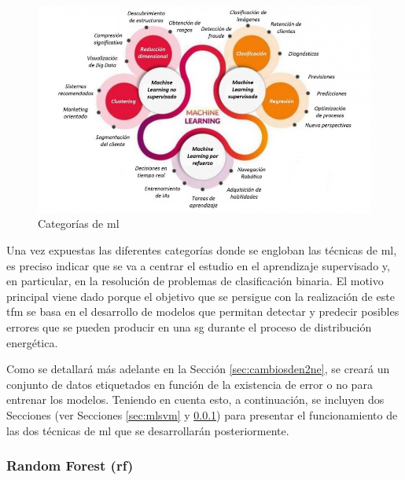 \begin{figure}[h!]
    \centering
    \includegraphics[width=1\textwidth]{img/teoria/ml.jpeg}
    \caption{Categorías de \acrshort{ml} \cite{metal}}
    \label{fig:ml}
\end{figure}

\vspace{3mm}

Una vez expuestas las diferentes categorías donde se engloban las técnicas de \gls{ml}, es preciso indicar que se va a centrar el estudio en el aprendizaje supervisado y, en particular, en la resolución de problemas de clasificación binaria. El motivo principal viene dado porque el objetivo que se persigue con la realización de este \gls{tfm} se basa en el desarrollo de modelos que permitan detectar y predecir posibles errores que se pueden producir en una \gls{sg} durante el proceso de distribución energética. 

\vspace{3mm}

Como se detallará más adelante en la Sección \ref{sec:cambiosden2ne}, se creará un conjunto de datos etiquetados en función de la existencia de error o no para entrenar los modelos. Teniendo en cuenta esto, a continuación, se incluyen dos Secciones (ver Secciones \ref{sec:mlsvm} y \ref{sec:mlrf}) para presentar el funcionamiento de las dos técnicas de \gls{ml} que se desarrollarán posteriormente.

\subsubsection{Random Forest (\acrshort{rf})}
\label{sec:mlrf}







